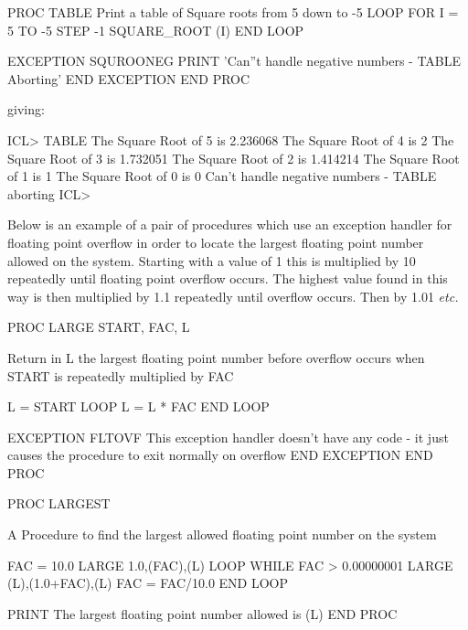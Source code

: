 \documentclass[twoside,11pt,nolof,chapters]{starlink}
\begin{document}
\begin{terminalv}
    PROC TABLE
    {  Print a table of Square roots from 5 down to -5  }
       LOOP FOR I = 5 TO -5 STEP -1
         SQUARE_ROOT (I)
       END LOOP

       EXCEPTION SQUROONEG
          PRINT 'Can''t handle negative numbers - TABLE Aborting'
       END EXCEPTION
    END PROC
\end{terminalv}

giving:

\begin{terminalv}
    ICL> TABLE
    The Square Root of 5 is 2.236068
    The Square Root of 4 is 2
    The Square Root of 3 is 1.732051
    The Square Root of 2 is 1.414214
    The Square Root of 1 is 1
    The Square Root of 0 is 0
    Can't handle negative numbers - TABLE aborting
    ICL>
\end{terminalv}

Below is an example of a pair of procedures which use an exception handler
for floating point overflow in order to locate the largest floating point
number allowed on the system. Starting with a value of 1 this is multiplied
by 10 repeatedly until floating point overflow occurs. The highest value
found in this way is then multiplied by 1.1 repeatedly until overflow occurs.
Then by 1.01 \emph{etc.}

\begin{terminalv}
    PROC LARGE  START, FAC, L

    { Return in L the largest floating point number before        }
    { overflow occurs when START is repeatedly multiplied by FAC  }

      L = START
      LOOP
        L = L * FAC
      END LOOP

      EXCEPTION FLTOVF
      { This exception handler doesn't have any code - it just  }
      { causes the procedure to exit normally on overflow       }
      END EXCEPTION
    END PROC

    PROC LARGEST

    {  A Procedure to find the largest allowed floating point   }
    {  number on the system                                     }

      FAC = 10.0
      LARGE  1.0,(FAC),(L)
      LOOP WHILE FAC > 0.00000001
         LARGE (L),(1.0+FAC),(L)
         FAC = FAC/10.0
      END LOOP

      PRINT  The largest floating point number allowed is (L)
    END PROC
\end{terminalv}
\end{document}
